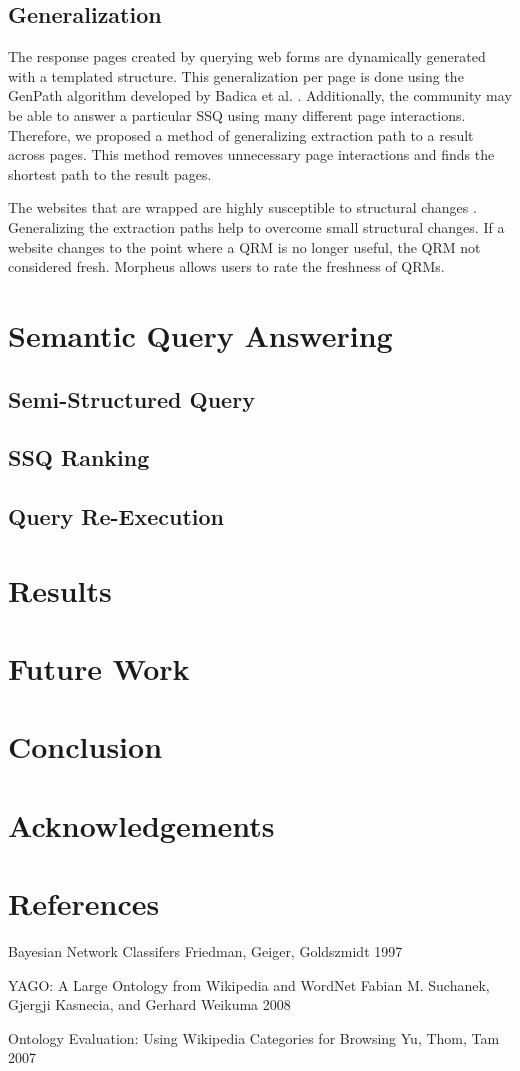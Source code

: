 \documentclass{www2010-submission}
\begin{document}
\subsection{Generalization}
The response pages created by querying web forms are
dynamically generated with a templated structure.
This
generalization per page is done using the GenPath algorithm developed by Badica et al. \cite{Badica06}. Additionally, the community may be able to answer a particular SSQ using many different page interactions. Therefore, we proposed a method of generalizing extraction path to a result across pages. This method removes unnecessary page interactions and finds the shortest path to the result pages.

The websites that are wrapped are highly susceptible to structural changes \cite{TanZMG07}. Generalizing the extraction paths help to overcome small structural changes. If a website changes to the point where a QRM is no longer useful, the QRM not considered fresh. Morpheus allows users to rate the freshness of QRMs.


\section{Semantic Query Answering}
\subsection{Semi-Structured Query}
\subsection{SSQ Ranking}
\subsection{Query Re-Execution}

\section{Results}

\section{Future Work}

\section{Conclusion}

\section{Acknowledgements}

\section{References}
Bayesian Network Classifers
Friedman, Geiger, Goldszmidt 1997

YAGO: A Large Ontology from Wikipedia and WordNet
Fabian M. Suchanek, Gjergji Kasnecia, and Gerhard Weikuma 2008

Ontology Evaluation: Using Wikipedia Categories for Browsing
Yu, Thom, Tam 2007
\end{document}
